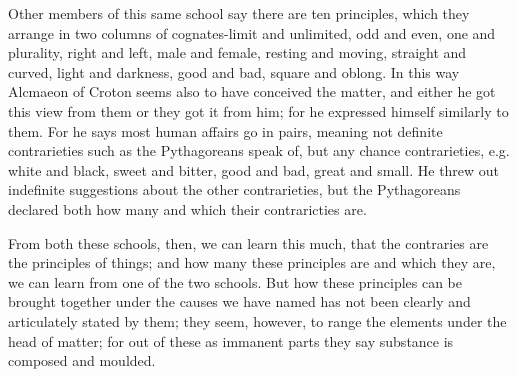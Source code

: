 \documentclass[oneside, 17pt, dvipsnames]{extbook}
\begin{document}
Other members of this same school say there are ten principles, which they arrange in two columns of cognates-limit and unlimited, odd and even, one and plurality, right and left, male and female, resting and moving, straight and curved, light and darkness, good and bad, square and oblong. In this way Alcmaeon of Croton seems also to have conceived the matter, and either he got this view from them or they got it from him; for he expressed himself similarly to them. For he says most human affairs go in pairs, meaning not definite contrarieties such as the Pythagoreans speak of, but any chance contrarieties, e.g. white and black, sweet and bitter, good and bad, great and small. He threw out indefinite suggestions about the other contrarieties, but the Pythagoreans declared both how many and which their contraricties are.

From both these schools, then, we can learn this much, that the contraries are the principles of things; and how many these principles are and which they are, we can learn from one of the two schools. But how these principles can be brought together under the causes we have named has not been clearly and articulately stated by them; they seem, however, to range the elements under the head of matter; for out of these as immanent parts they say substance is composed and moulded.
\end{document}
